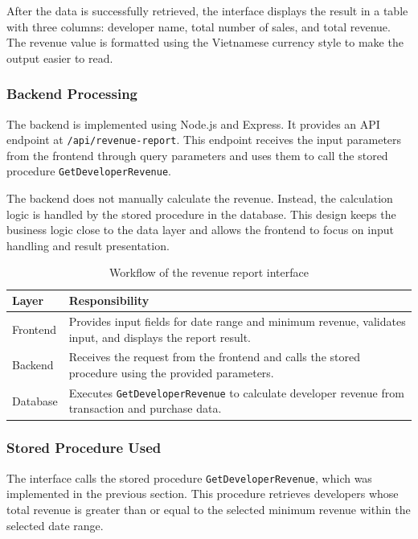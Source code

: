 After the data is successfully retrieved, the interface displays the result in a table with three columns: developer name, total number of sales, and total revenue. 
The revenue value is formatted using the Vietnamese currency style to make the output easier to read.
\subsubsection{Backend Processing}

The backend is implemented using Node.js and Express. 
It provides an API endpoint at \texttt{/api/revenue-report}. 
This endpoint receives the input parameters from the frontend through query parameters and uses them to call the stored procedure \texttt{GetDeveloperRevenue}.

The backend does not manually calculate the revenue. 
Instead, the calculation logic is handled by the stored procedure in the database. 
This design keeps the business logic close to the data layer and allows the frontend to focus on input handling and result presentation.

\begin{table}[H]
\centering
\caption{Workflow of the revenue report interface}
\label{tab:revenue-report-workflow}
\begin{tabular}{|l|p{9cm}|}
\hline
\textbf{Layer} & \textbf{Responsibility} \\ \hline
Frontend & Provides input fields for date range and minimum revenue, validates input, and displays the report result. \\ \hline
Backend & Receives the request from the frontend and calls the stored procedure using the provided parameters. \\ \hline
Database & Executes \texttt{GetDeveloperRevenue} to calculate developer revenue from transaction and purchase data. \\ \hline
\end{tabular}
\end{table}
\subsubsection{Stored Procedure Used}

The interface calls the stored procedure \texttt{GetDeveloperRevenue}, which was implemented in the previous section. 
This procedure retrieves developers whose total revenue is greater than or equal to the selected minimum revenue within the selected date range.

